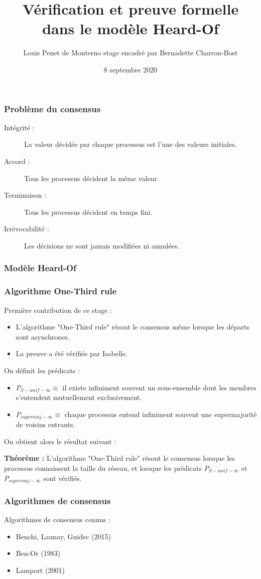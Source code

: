 \documentclass{beamer}
\title{Vérification et preuve formelle dans le modèle Heard-Of}
\date{8 septembre 2020}
\author{Louis Penet de Monterno \linebreak \scriptsize{stage encadré par Bernadette Charron-Bost}}
\institute{LIX}
\begin{document}
\begin{frame}
\frametitle{Problème du consensus}
\begin{description}
	\item[Intégrité :] La valeur décidée par chaque processus est l'une des valeurs initiales.
	\item[Accord :] Tous les processus décident la même valeur.
	\item[Terminaison :] Tous les processus décident en temps fini.
	\item[Irrévocabilité :] Les décisions ne sont jamais modifiées ni annulées.
\end{description}
\end{frame}

\begin{frame}
\frametitle{Modèle Heard-Of}
\end{frame}

\begin{frame}
\frametitle{Algorithme One-Third rule}
Première contribution de ce stage :
\begin{itemize}
	\item L'algorithme "One-Third rule" résout le consensus même lorsque les départs sont asynchrones.
	\item La preuve a été vérifiée par Isabelle.
\end{itemize}
\tiny{
On définit les prédicats :
\begin{itemize}
	\item $P_{S-unif-\infty} \equiv$ il existe infiniment souvent un sous-ensemble dont les membres s'entendent mutuellement exclusivement.
	\item $P_{supermaj-\infty} \equiv$ chaque processus entend infiniment souvent une supermajorité de voisins entrants.
\end{itemize}
On obtient alors le résultat suivant :

	\textbf{Théorème : } L'algorithme "One-Third rule" résout  le consensus lorsque les processus connaissent la taille du réseau,
	et lorsque les prédicats $P_{S-unif-\infty}$ et $P_{supermaj-\infty}$ sont vérifiés.
}
\end{frame}

\begin{frame}
\frametitle{Algorithmes de consensus}
Algorithmes de consensus connus :
	\begin{itemize}
		\item{ \scriptsize{Benchi, Launay, Guidec (2015)}}
		\item{ \scriptsize{Ben-Or (1983)}}
		\item{ \scriptsize{Lamport (2001)}}
	\end{itemize}
\end{frame}
\end{document}
